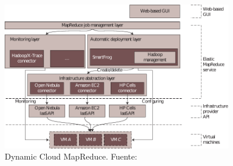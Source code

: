 \begin{figure}[tbp]
\begin{center}
\includegraphics[width=0.9\textwidth]{imagenes/037.pdf}
 \caption{Dynamic Cloud MapReduce. Fuente: \cite{dynamicmapreduce}}
\label{fig:arquitecturadynamicmapreduce}
\end{center}
\end{figure}

